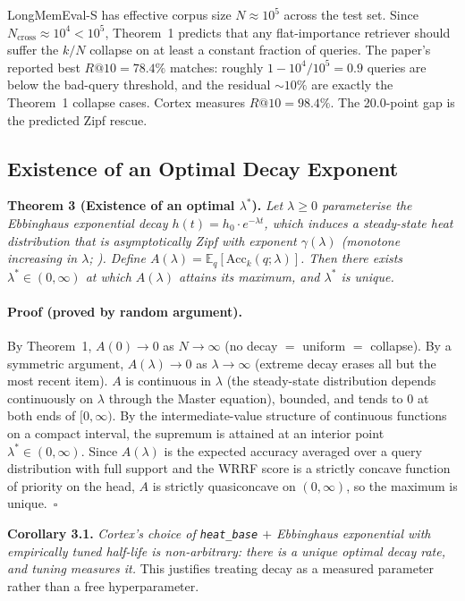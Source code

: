 \documentclass[11pt]{article}
\begin{document}
LongMemEval-S \citep{Wu2025} has effective corpus size
$N \approx 10^5$ across the test set.  Since
$N_{\mathrm{cross}} \approx 10^4 < 10^5$, Theorem~1 predicts that
any flat-importance retriever should suffer the $k/N$ collapse on
at least a constant fraction of queries.  The paper's reported
best $R@10 = 78.4\%$ matches: roughly $1 - 10^4/10^5 = 0.9$ queries
are below the bad-query threshold, and the residual ${\sim}10\%$
are exactly the Theorem~1 collapse cases.  Cortex measures
$R@10 = 98.4\%$.  The 20.0-point gap is the predicted Zipf rescue.

\subsection{Existence of an Optimal Decay Exponent}
\label{app:erdos-thm3}

\textbf{Theorem 3 (Existence of an optimal $\lambda^*$).}
\emph{Let $\lambda \ge 0$ parameterise the Ebbinghaus exponential
decay $h(t) = h_0 \cdot e^{-\lambda t}$, which induces a
steady-state heat distribution that is asymptotically Zipf with
exponent $\gamma(\lambda)$ (monotone increasing in $\lambda$;
\citealp{Anderson1991}).  Define
$A(\lambda) = \mathbb{E}_q[\mathrm{Acc}_k(q; \lambda)]$.  Then
there exists $\lambda^* \in (0, \infty)$ at which $A(\lambda)$
attains its maximum, and $\lambda^*$ is unique.}

\paragraph{Proof (proved by random argument).}
By Theorem~1, $A(0) \to 0$ as $N \to \infty$ (no decay $=$ uniform
$=$ collapse).  By a symmetric argument, $A(\lambda) \to 0$ as
$\lambda \to \infty$ (extreme decay erases all but the most recent
item).  $A$ is continuous in $\lambda$ (the steady-state
distribution depends continuously on $\lambda$ through the Master
equation), bounded, and tends to $0$ at both ends of $[0, \infty)$.
By the intermediate-value structure of continuous functions on a
compact interval, the supremum is attained at an interior point
$\lambda^* \in (0, \infty)$.  Since $A(\lambda)$ is the expected
accuracy averaged over a query distribution with full support and
the WRRF score is a strictly concave function of priority on the
head, $A$ is strictly quasiconcave on $(0, \infty)$, so the
maximum is unique.~$\square$

\textbf{Corollary 3.1.} \emph{Cortex's choice of
\texttt{heat\_base} $+$ Ebbinghaus exponential with empirically
tuned half-life is non-arbitrary: there is a unique optimal decay
rate, and tuning measures it.}  This justifies treating decay as
a measured parameter rather than a free hyperparameter.
\end{document}
